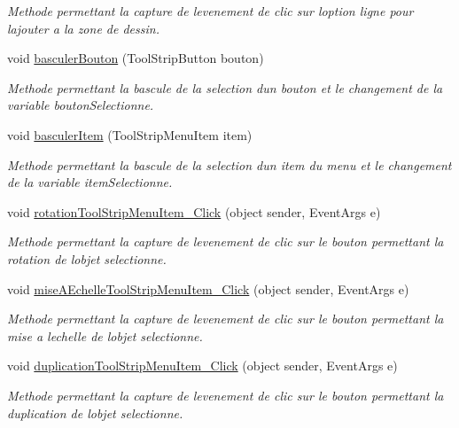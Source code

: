 \begin{DoxyCompactItemize}
\begin{DoxyCompactList}\small\item\em Methode permettant la capture de l\textquotesingle{}evenement de clic sur l\textquotesingle{}option ligne pour l\textquotesingle{}ajouter a la zone de dessin. \end{DoxyCompactList}\item 
void \hyperlink{group__inf2990_ga0921f3f414eaefc96da4a6e82eb4fd22}{basculer\+Bouton} (Tool\+Strip\+Button bouton)
\begin{DoxyCompactList}\small\item\em Methode permettant la bascule de la selection d\textquotesingle{}un bouton et le changement de la variable bouton\+Selectionne. \end{DoxyCompactList}\item 
void \hyperlink{group__inf2990_ga4ae54cc42b72d53d3c7b463ab15cf8cc}{basculer\+Item} (Tool\+Strip\+Menu\+Item item)
\begin{DoxyCompactList}\small\item\em Methode permettant la bascule de la selection d\textquotesingle{}un item du menu et le changement de la variable item\+Selectionne. \end{DoxyCompactList}\item 
void \hyperlink{group__inf2990_gad093807a11597718f52b940dbf3d631d}{rotation\+Tool\+Strip\+Menu\+Item\+\_\+\+Click} (object sender, Event\+Args e)
\begin{DoxyCompactList}\small\item\em Methode permettant la capture de l\textquotesingle{}evenement de clic sur le bouton permettant la rotation de l\textquotesingle{}objet selectionne. \end{DoxyCompactList}\item 
void \hyperlink{group__inf2990_ga6600767024c2449b9f36a08e4b90093f}{mise\+A\+Echelle\+Tool\+Strip\+Menu\+Item\+\_\+\+Click} (object sender, Event\+Args e)
\begin{DoxyCompactList}\small\item\em Methode permettant la capture de l\textquotesingle{}evenement de clic sur le bouton permettant la mise a l\textquotesingle{}echelle de l\textquotesingle{}objet selectionne. \end{DoxyCompactList}\item 
void \hyperlink{group__inf2990_gaaa06b23bcef9040e4a68cea2ef29df48}{duplication\+Tool\+Strip\+Menu\+Item\+\_\+\+Click} (object sender, Event\+Args e)
\begin{DoxyCompactList}\small\item\em Methode permettant la capture de l\textquotesingle{}evenement de clic sur le bouton permettant la duplication de l\textquotesingle{}objet selectionne. \end{DoxyCompactList}\item 

\end{DoxyCompactItemize}
